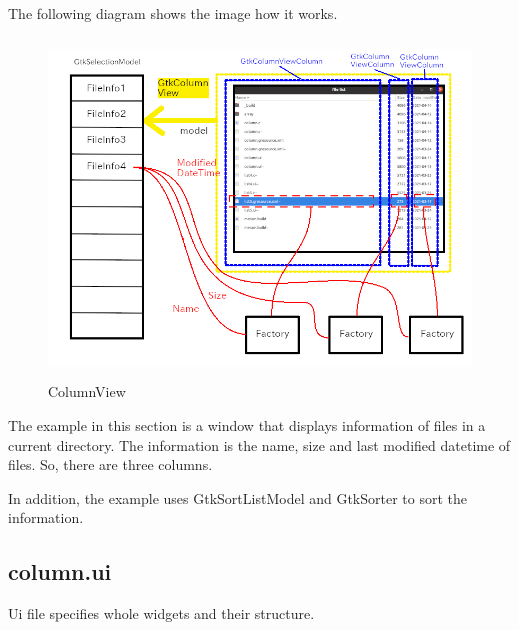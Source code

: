 The following diagram shows the image how it works.

\begin{figure}
\centering
\includegraphics[width=12cm,height=9cm]{../image/column.png}
\caption{ColumnView}
\end{figure}

The example in this section is a window that displays information of
files in a current directory. The information is the name, size and last
modified datetime of files. So, there are three columns.

In addition, the example uses GtkSortListModel and GtkSorter to sort the
information.

\hypertarget{column.ui}{%
\subsection{column.ui}\label{column.ui}}

Ui file specifies whole widgets and their structure.

